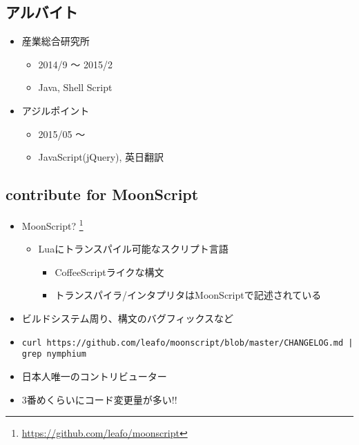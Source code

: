 \documentclass[aspectratio=169,unicode]{beamer}
\begin{document}
\subsection{アルバイト}
\begin{frame}
	\frametitlesubs

	\begin{itemize}
		\item 産業総合研究所
			\begin{itemize}
				\item 2014/9 〜 2015/2
				\item Java, Shell Script
		\end{itemize}
		\item アジルポイント
			\begin{itemize}
				\item 2015/05 〜
				\item JavaScript(jQuery), 英日翻訳
			\end{itemize}
	\end{itemize}
\end{frame}
\subsection{contribute for MoonScript}
\begin{frame}
	\frametitlesubs
	\begin{itemize}
		\item MoonScript? \footnote{\url{https://github.com/leafo/moonscript}}
			\begin{itemize}
				\item Luaにトランスパイル可能なスクリプト言語

					\begin{itemize}
						\item CoffeeScriptライクな構文
						\item トランスパイラ/インタプリタはMoonScriptで記述されている
					\end{itemize}
			\end{itemize}\pause

		\item ビルドシステム周り、構文のバグフィックスなど
		\item {\footnotesize{}\lstinline{curl https://github.com/leafo/moonscript/blob/master/CHANGELOG.md | grep nymphium}}
		\item \alert{日本人唯一のコントリビューター}
		\item 3番めくらいにコード変更量が多い!!
\end{itemize}\end{frame}
\end{document}
